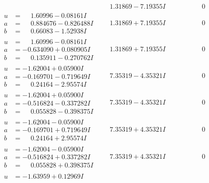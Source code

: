 \documentclass[1p]{elsarticle_modified}
\theoremstyle{definition}
\begin{document}
$$\begin{array}{c|c|c}
 & \phantom{-}1.31869 - 7.19355 I & \phantom{-0.000000 } 0 \\ \hline\begin{aligned}
u &= \phantom{-}1.60996 - 0.08161 I \\
a &= \phantom{-}0.884676 - 0.826488 I \\
b &= \phantom{-}0.66083 - 1.52938 I\end{aligned}
 & \phantom{-}1.31869 + 7.19355 I & \phantom{-0.000000 } 0 \\ \hline\begin{aligned}
u &= \phantom{-}1.60996 - 0.08161 I \\
a &= -0.634090 + 0.080905 I \\
b &= \phantom{-}0.135911 - 0.270762 I\end{aligned}
 & \phantom{-}1.31869 + 7.19355 I & \phantom{-0.000000 } 0 \\ \hline\begin{aligned}
u &= -1.62004 + 0.05900 I \\
a &= -0.169701 - 0.719649 I \\
b &= \phantom{-}0.24164 - 2.95574 I\end{aligned}
 & \phantom{-}7.35319 - 4.35321 I & \phantom{-0.000000 } 0 \\ \hline\begin{aligned}
u &= -1.62004 + 0.05900 I \\
a &= -0.516824 - 0.337282 I \\
b &= \phantom{-}0.055828 - 0.398375 I\end{aligned}
 & \phantom{-}7.35319 - 4.35321 I & \phantom{-0.000000 } 0 \\ \hline\begin{aligned}
u &= -1.62004 - 0.05900 I \\
a &= -0.169701 + 0.719649 I \\
b &= \phantom{-}0.24164 + 2.95574 I\end{aligned}
 & \phantom{-}7.35319 + 4.35321 I & \phantom{-0.000000 } 0 \\ \hline\begin{aligned}
u &= -1.62004 - 0.05900 I \\
a &= -0.516824 + 0.337282 I \\
b &= \phantom{-}0.055828 + 0.398375 I\end{aligned}
 & \phantom{-}7.35319 + 4.35321 I & \phantom{-0.000000 } 0 \\ \hline\begin{aligned}
u &= -1.63959 + 0.12969 I \\

\end{aligned}
\end{array}$$
\end{document}
